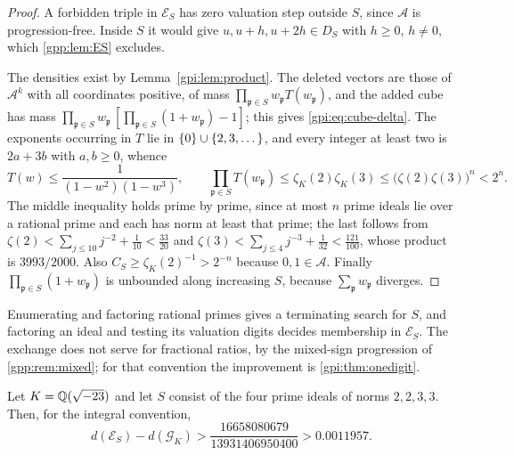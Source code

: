 \begin{proof}
A forbidden triple in $\mathcal E_S$ has zero valuation step outside $S$, since $\mathcal A$
is progression-free. Inside $S$ it would give $u,u+h,u+2h\in D_S$ with $h\ge0$, $h\ne0$, which
\cref{gpp:lem:ES} excludes.

The densities exist by Lemma~\ref{gpi:lem:product}. The deleted vectors are those of
$\mathcal A^k$ with all coordinates positive, of mass
$\prod_{\mathfrak p\in S}w_{\mathfrak p}T(w_{\mathfrak p})$, and the added cube has mass
$\prod_{\mathfrak p\in S}w_{\mathfrak p}\,[\prod_{\mathfrak p\in S}(1+w_{\mathfrak p})-1]$; this gives
\eqref{gpi:eq:cube-delta}. The exponents occurring in $T$ lie in $\{0\}\cup\{2,3,\dots\}$,
and every integer at least two is $2a+3b$ with $a,b\ge0$, whence
\[
 T(w)\le\frac1{(1-w^2)(1-w^3)},\qquad
 \prod_{\mathfrak p\in S}T(w_{\mathfrak p})\le\zeta_K(2)\zeta_K(3)\le\bigl(\zeta(2)\zeta(3)\bigr)^n<2^n .
\]
The middle inequality holds prime by prime, since at most $n$ prime ideals lie over a
rational prime and each has norm at least that prime; the last follows from
$\zeta(2)<\sum_{j\le10}j^{-2}+\tfrac1{10}<\tfrac{33}{20}$ and
$\zeta(3)<\sum_{j\le4}j^{-3}+\tfrac1{32}<\tfrac{121}{100}$, whose product is $3993/2000$.
Also $C_S\ge\zeta_K(2)^{-1}>2^{-n}$ because $0,1\in\mathcal A$. Finally
$\prod_{\mathfrak p\in S}(1+w_{\mathfrak p})$ is unbounded along increasing $S$, because
$\sum_{\mathfrak p}w_{\mathfrak p}$ diverges.
\end{proof}

Enumerating and factoring rational primes gives a terminating search for $S$, and factoring
an ideal and testing its valuation digits decides membership in $\mathcal E_S$. The exchange
does not serve for fractional ratios, by the mixed-sign progression of \cref{gpp:rem:mixed};
for that convention the improvement is \cref{gpi:thm:onedigit}.

\begin{proposition}\label{gpi:prop:Q23gain}
Let $K=\mathbb{Q}(\sqrt{-23})$ and let $S$ consist of the four prime ideals of norms $2,2,3,3$. Then,
for the integral convention,
\[
 d(\mathcal E_S)-d(\mathcal G_K)>\frac{16658080679}{13931406950400}>0.0011957 .
\]
\end{proposition}

